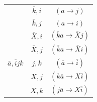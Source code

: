 \begin{table}
\begin{tabular}{ c|c|c }
		                                                                                                   & $\bar k,i$                                                                                   & $(a\rightarrow j)$                                              \\
		                                                                                                   & $\bar k,j$                                                                                   & $(a\rightarrow i)$                                              \\
		                                                                                                   & $\bar X,i$                                                                                   & $(\bar ka  \rightarrow \bar X j)$                               \\
		                                                                                                   & $\bar X,j$                                                                                   & $(\bar ka  \rightarrow \bar X i)$                               \\
		\hline
		\rule{0pt}{3ex} $\bar a,\bar i j k$                                                                                & $j,k$                                                                                        & $(\bar a\rightarrow \bar i)$                                    \\
		                                                                                                   & $X,j$                                                                                        & $(k\bar a\rightarrow X\bar i)$                                  \\
		                                                                                                   & $X,k$                                                                                        & $(j\bar a\rightarrow X\bar i)$                                  \\
		                 

\end{tabular}
\end{table}
